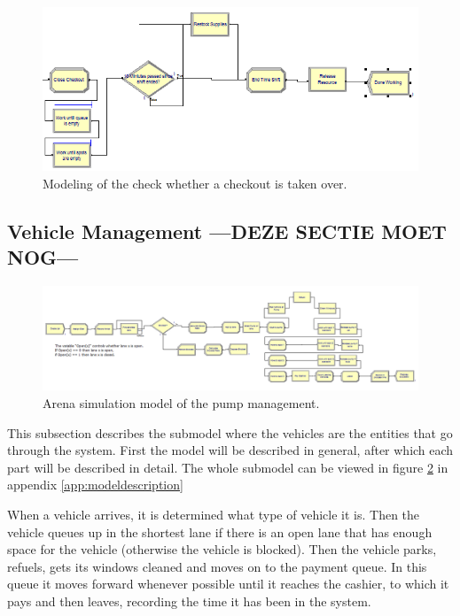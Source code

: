 \begin{figure}[h!]
\begin{center}
\includegraphics[scale=1]{images/model-description/close-restock-release.PNG}
	\caption{Modeling of the check whether a checkout is taken over.}
	\label{fig:closerestockandrelease}
\end{center}
\end{figure}

\clearpage
\subsection{Vehicle Management ---DEZE SECTIE MOET NOG---}\label{app:pumpdescription}
\begin{figure}[!ht]
\begin{center}
	\includegraphics[scale=0.5]{images/model-description/pumps}
	\caption{Arena simulation model of the pump management.}
	\label{fig:modelpumps}
\end{center}
\end{figure}

This subsection describes the submodel where the vehicles are the entities that go through the system. First the model will be described in general, after which each part will be described in detail. The whole submodel can be viewed in figure \ref{fig:modelpumps} in appendix \ref{app:modeldescription}

When a vehicle arrives, it is determined what type of vehicle it is. Then the vehicle queues up in the shortest lane if there is an open lane that has enough space for the vehicle (otherwise the vehicle is blocked). Then the vehicle parks, refuels, gets its windows cleaned and moves on to the payment queue. In this queue it moves forward whenever possible until it reaches the cashier, to which it pays and then leaves, recording the time it has been in the system.

